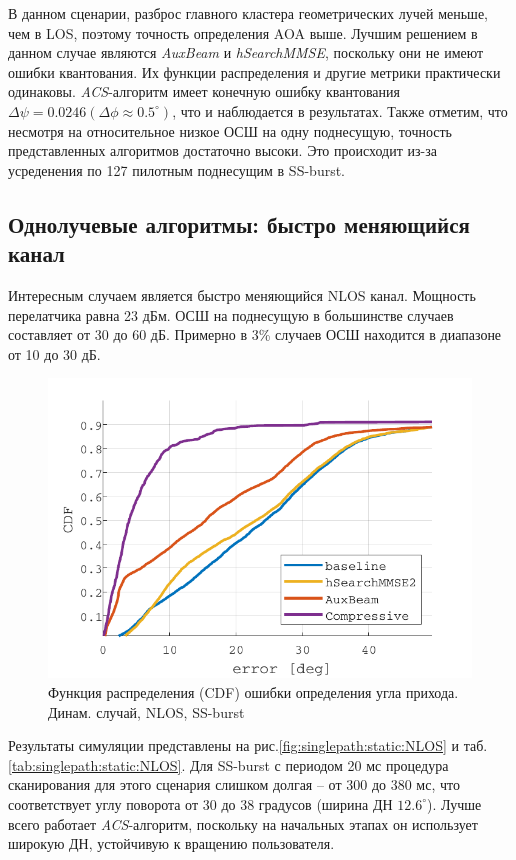 В данном сценарии, разброс главного кластера геометрических лучей меньше, чем в
LOS, поэтому точность определения AOA выше. Лучшим решением в данном случае
являются \textit{AuxBeam} и \textit{hSearchMMSE}, поскольку они не имеют ошибки
квантования. Их функции распределения и другие метрики практически одинаковы.
\textit{ACS}-алгоритм имеет конечную ошибку квантования
$\Delta \psi = 0.0246 (\Delta \phi \approx 0.5^\circ)$, что и наблюдается в
результатах.  Также отметим, что несмотря на относительное низкое ОСШ на одну
поднесущую, точность представленных алгоритмов достаточно высоки. Это происходит
из-за усреденения по 127 пилотным поднесущим в SS-burst.

\subsection{Однолучевые алгоритмы: быстро меняющийся канал }
\label{sec:singlepath:rotation:NLOS}
Интересным случаем является быстро меняющийся NLOS канал. Мощность перелатчика
равна 23 дБм.  ОСШ на поднесущую в большинстве случаев составляет от 30 до 60
дБ. Примерно в 3\% случаев ОСШ находится в диапазоне от 10 до 30 дБ.

\begin{figure}[ht]
  \centering
  \includegraphics{results/rus/singlepath-rotation-NLOS-1}
  \caption{Функция распределения (CDF) ошибки определения угла прихода. Динам. случай, NLOS, SS-burst}
  \label{fig:singlepath:rotation:NLOS-1}
\end{figure}
Результаты симуляции представлены на рис.\ref{fig:singlepath:static:NLOS} и
таб.  \ref{tab:singlepath:static:NLOS}.
Для SS-burst с периодом 20 мс процедура сканирования для этого сценария слишком долгая --
от 300 до 380 мс, что соответствует углу поворота от 30 до 38 градусов (ширина ДН $12.6^\circ$).
Лучше всего работает \textit{ACS}-алгоритм, поскольку на начальных этапах
он использует широкую ДН, устойчивую к вращению пользователя. 

